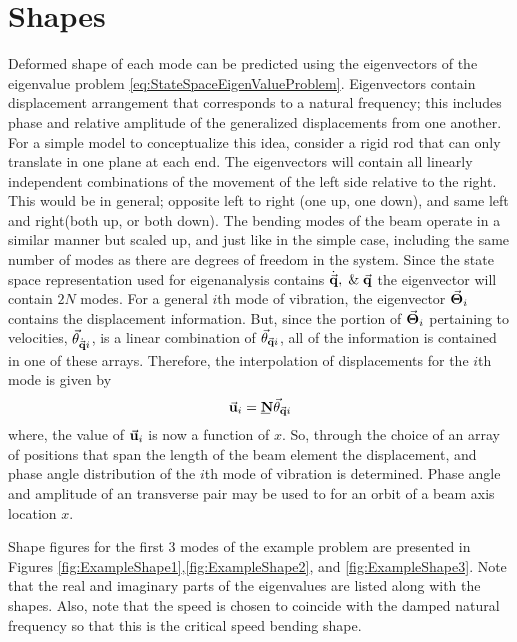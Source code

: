 \section{Shapes}
Deformed shape of each mode can be predicted using the eigenvectors of the eigenvalue problem \ref{eq:StateSpaceEigenValueProblem}. Eigenvectors contain displacement arrangement that corresponds to a natural frequency; this includes phase and relative amplitude of the generalized displacements from one another. For a simple model to conceptualize this idea, consider a rigid rod that can only translate in one plane at each end. The eigenvectors will contain all linearly independent combinations of the movement of the left side relative to the right. This would be in general; opposite left to right (one up, one down), and same left and right(both up, or both down). The bending modes of the beam operate in a similar manner but scaled up, and just like in the simple case, including the same number of modes as there are degrees of freedom in the system. Since the state space representation used for eigenanalysis contains $ \dot{\vec{\mathbf{q}}},\; \& \;\vec{\mathbf{q}} $ the eigenvector will contain $ 2N $ modes. For a general $ i $th mode of vibration, the eigenvector $ \vec{\mathbf{\Theta}}_i $ contains the displacement information. But, since the portion of $ \vec{\mathbf{\Theta}}_i $ pertaining to velocities, $ \vec{\mathbf{\theta}}_{\dot{\vec{\mathbf{q}}}i} $, is a linear combination of $ \vec{\mathbf{\theta}}_{\vec{\mathbf{q}}i} $, all of the information is contained in one of these arrays. Therefore, the interpolation of displacements for the $ i $th mode is given by
	\begin{equation}
	\vect{u}_i=\mat{N}\vect{\theta}_{\vect{q}i}
	\end{equation}
where, the value of $ \vec{\mathbf{u}}_i $ is now a function of $ x $. So, through the choice of an array of positions that span the length of the beam element the displacement, and phase angle distribution of the $ i $th mode of vibration is determined. Phase angle and amplitude of an transverse pair may be used to for an orbit of a beam axis location $ x $.\par
Shape figures for the first 3 modes of the example problem are presented in Figures \ref{fig:ExampleShape1},\ref{fig:ExampleShape2}, and \ref{fig:ExampleShape3}. Note that the real and imaginary parts of the eigenvalues are listed along with the shapes. Also, note that the speed is chosen to coincide with the damped natural frequency so that this is the critical speed bending shape.\par
